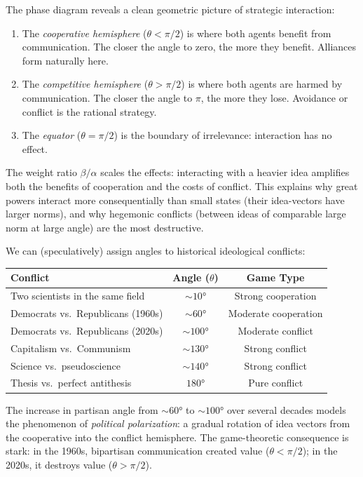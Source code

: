 \begin{interpretation}
\label{interp:realpolitik}
The phase diagram reveals a clean geometric picture of strategic interaction:

\begin{enumerate}
\item The \emph{cooperative hemisphere} ($\theta < \pi/2$) is where both agents
benefit from communication. The closer the angle to zero, the more they benefit.
Alliances form naturally here.

\item The \emph{competitive hemisphere} ($\theta > \pi/2$) is where both agents
are harmed by communication. The closer the angle to $\pi$, the more they lose.
Avoidance or conflict is the rational strategy.

\item The \emph{equator} ($\theta = \pi/2$) is the boundary of irrelevance:
interaction has no effect.
\end{enumerate}

The weight ratio $\beta/\alpha$ scales the effects: interacting with a heavier
idea amplifies both the benefits of cooperation and the costs of conflict. This
explains why great powers interact more consequentially than small states
(their idea-vectors have larger norms), and why hegemonic conflicts (between
ideas of comparable large norm at large angle) are the most destructive.
\end{interpretation}

\begin{example}
\label{ex:historical}
We can (speculatively) assign angles to historical ideological conflicts:

\begin{center}
\begin{tabular}{lcc}
\textbf{Conflict} & \textbf{Angle ($\theta$)} & \textbf{Game Type} \\
\hline
Two scientists in the same field & $\sim 10°$ & Strong cooperation \\
Democrats vs.\ Republicans (1960s) & $\sim 60°$ & Moderate cooperation \\
Democrats vs.\ Republicans (2020s) & $\sim 100°$ & Moderate conflict \\
Capitalism vs.\ Communism & $\sim 130°$ & Strong conflict \\
Science vs.\ pseudoscience & $\sim 140°$ & Strong conflict \\
Thesis vs.\ perfect antithesis & $180°$ & Pure conflict \\
\end{tabular}
\end{center}

The increase in partisan angle from $\sim 60°$ to $\sim 100°$ over several
decades models the phenomenon of \emph{political polarization}: a gradual
rotation of idea vectors from the cooperative into the conflict hemisphere.
The game-theoretic consequence is stark: in the 1960s, bipartisan communication
created value ($\theta < \pi/2$); in the 2020s, it destroys value ($\theta >
\pi/2$).
\end{example}


